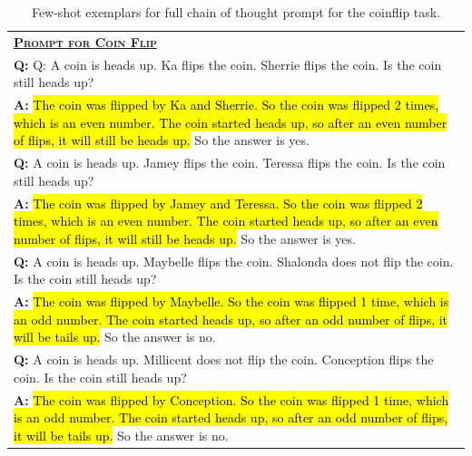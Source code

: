 \documentclass[]{article}
\theoremstyle{plain}
\theoremstyle{definition}
\theoremstyle{remark}
\begin{document}
\begin{table}[H]
    \caption{
    Few-shot exemplars for full chain of thought prompt for the coinflip task.
    }
    \centering
    \small
    \begin{tabular}{p{\linewidth}}
        \toprule
        \underline{\textbf{\textsc{Prompt for Coin Flip}}} \\
        \vspace{-2mm}
        \textbf{Q:} Q: A coin is heads up. Ka flips the coin. Sherrie flips the coin. Is the coin still heads up? \\
        \vspace{-1mm}
        \textbf{A:} \hl{The coin was flipped by Ka and Sherrie. So the coin was flipped 2 times, which is an even number. The coin started heads up, so after an even number of flips, it will still be heads up.} So the answer is yes. \\
        \vspace{0mm}
        \textbf{Q:} A coin is heads up. Jamey flips the coin. Teressa flips the coin. Is the coin still heads up? \\
        \vspace{-1mm}
        \textbf{A:} \hl{The coin was flipped by Jamey and Teressa. So the coin was flipped 2 times, which is an even number. The coin started heads up, so after an even number of flips, it will still be heads up.} So the answer is yes. \\
        \vspace{0mm}
        \textbf{Q:} A coin is heads up. Maybelle flips the coin. Shalonda does not flip the coin. Is the coin still heads up? \\
        \vspace{-1mm}
        \textbf{A:} \hl{The coin was flipped by Maybelle. So the coin was flipped 1 time, which is an odd number. The coin started heads up, so after an odd number of flips, it will be tails up.} So the answer is no. \\
        \vspace{0mm}
        \textbf{Q:} A coin is heads up. Millicent does not flip the coin. Conception flips the coin. Is the coin still heads up? \\
        \vspace{-1mm}
        \textbf{A:} \hl{The coin was flipped by Conception. So the coin was flipped 1 time, which is an odd number. The coin started heads up, so after an odd number of flips, it will be tails up.} So the answer is no. \\

\end{tabular}
\end{table}
\end{document}
